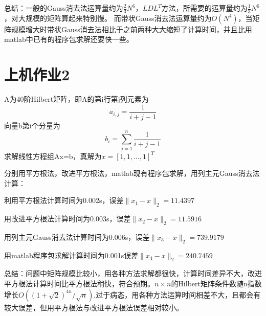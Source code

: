 \documentclass[withoutpreface,bwprint]{cumcmthesis}
\begin{document}
总结：一般的Gauss消去法运算量约为$\frac{2}{3}N^6$，$LDL^T$方法，所需要的运算量约为$\frac{1}{3}N^6$，对大规模的矩阵算起来特别慢。
而带状Gauss消去法运算量约为$O(N^4)$，当矩阵规模增大时带状Gauss消去法相比于之前两种大大缩短了计算时间，并且比用matlab中已有的程序包求解还要快一些。

\section{上机作业2}
A为40阶Hilbert矩阵，即A的第i行第j列元素为
\begin{equation}
a_{i,j}=\frac{1}{i+j-1}
\end{equation}
向量b第i个分量为
\begin{equation}
b_i=\sum_{j=1}^n\frac{1}{i+j-1}
\end{equation}
求解线性方程组Ax=b，真解为$x=[1,1,\dots,1]^{T}$

分别用平方根法，改进平方根法，matlab现有程序包求解，用列主元Gauss消去法计算：

利用平方根法计算时间为0.002s，误差$\lVert x_{1}-x \rVert_{2}=11.4397$

用改进平方根法计算时间为0.003s，误差$\lVert x_{2}-x \rVert_{2}=11.5916$

用列主元Gauss消去法计算时间为0.006s，误差$\lVert x_{3}-x \rVert_{2}=739.9179$

用matlab程序包求解计算时间为0.001s误差$\lVert x_{4}-x \rVert_{2}=240.7459$

总结：问题中矩阵规模比较小，用各种方法求解都很快，计算时间差异不大，改进平方根法计算时间比平方根法稍快，符合预期。$n \times n$的Hilbert矩阵条件数随n指数增长$O((1+\sqrt{2})^{4n}/\sqrt{n})$,过于病态，用各种方法运算时间相差不大，且都会有较大误差，但用平方根法与改进平方根法误差相对较小。
\end{document}
